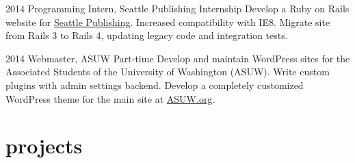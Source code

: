 \documentclass[]{friggeri-cv}
\begin{document}
\begin{entrylist}
  \entry 
    {2014}
    {Programming Intern, Seattle Publishing}
    {Internship}
    {Develop a Ruby on Rails website for \href{http://seattlepublishing.com}{Seattle Publishing}. Increased compatibility with IE8. Migrate site from Rails 3 to Rails 4, updating legacy code and integration tests.}
  
  \entry
    {2014}
    {Webmaster, ASUW}
    {Part-time}
    {Develop and maintain WordPress sites for the Associated Students of the University of Washington (ASUW). Write custom plugins with admin settings backend. Develop a completely customized WordPress theme for the main site at \href{http://asuw.org}{ASUW.org}.}
    
\end{entrylist}

\section{projects}
\end{document}

